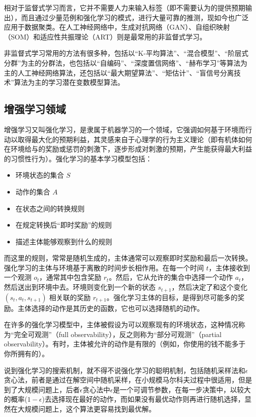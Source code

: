 \documentclass{elegantpaper}
\begin{document}
相对于监督式学习而言，它并不需要人力来输入标签（即不需要认为的提供预期输出），而且通过少量范例和强化学习的模式，进行大量可靠的推测，现如今也广泛应用于数据聚类。在人工神经网络中，生成对抗网络（GAN）、自组织映射（SOM）和适应性共振理论（ART）则是最常用的非监督式学习。

非监督式学习常用的方法有很多种，包括以“K-平均算法”、“混合模型”、“阶层式分群”为主的分群法，也包括以“自编码”、“深度置信网络”、“赫布学习”等算法为主的人工神经网络算法，还包括以“最大期望算法”、“矩估计”、“盲信号分离技术”算法为主的学习潜在变数模型算法。

\subsection{增强学习领域}

增强学习又叫强化学习，是隶属于机器学习的一个领域，它强调如何基于环境而行动以取得最大化的预期利益，其灵感来自于心理学的行为主义理论（即有机体如何在环境给与的奖励或惩罚的刺激下，逐步形成对刺激的预期，产生能获得最大利益的习惯性行为）。强化学习的基本学习模型包括：
\begin{itemize}[noitemsep]
      \item 环境状态的集合 $S$
      \item 动作的集合 $A$
      \item 在状态之间的转换规则
      \item 在规定转换后“即时奖励”的规则
      \item 描述主体能够观察到什么的规则
\end{itemize}

而这里的规则，常常是随机生成的，主体通常可以观察即时奖励和最后一次转换。强化学习的主体与环境基于离散的时间步长相作用。在每一个时间 $t$，主体接收到一个观测 $o_t$，通常其中包含奖励 $r_t$。然后，它从允许的集合中选择一个动作 $a_t$，然后送出到环境中去。环境则变化到一个新的状态 $s_{t+1}$，然后决定了和这个变化 $(s_t,a_t,s_{t+1})$ 相关联的奖励 $r_{t+1}$。强化学习主体的目标，是得到尽可能多的奖励。主体选择的动作是其历史的函数，它也可以选择随机的动作。

在许多的强化学习模型中，主体被假设为可以观察现有的环境状态，这种情况称为“完全可观测”（full observability），反之则称为“部分可观测”（partial observability）。有时，主体被允许的动作是有限的（例如，你使用的钱不能多于你所拥有的）。

说到强化学习的搜索机制，就不得不说强化学习的聪明机制，包括随机采样法和$\epsilon$贪心法，前者是通过在解空间中随机采样，在小规模马尔科夫过程中很适用，但是到了大规模问题上，后者$\epsilon$贪心法中$\epsilon$是一个可调节参数，在每一步决策中，以较大的概率($1-\epsilon$)去选择现在最好的动作，而如果没有最优动作则再进行随机选择，显然在大规模问题上，这个算法更容易找到最优解。
\end{document}
